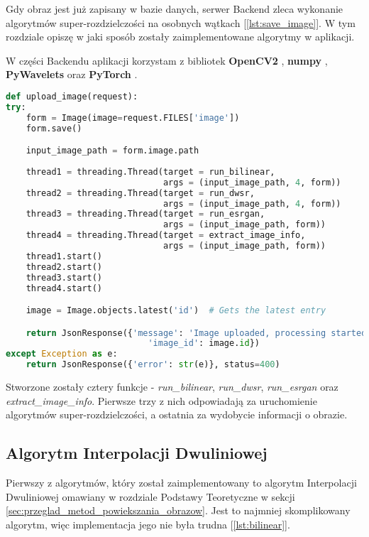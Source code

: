 Gdy obraz jest już zapisany w bazie danych, serwer Backend zleca wykonanie algorytmów super-rozdzielczości na osobnych wątkach [\ref{lst:save_image}]. W tym rozdziale opiszę w jaki sposób zostały zaimplementowane algorytmy w aplikacji.

W części Backendu aplikacji korzystam z bibliotek \textbf{OpenCV2} \cite{opencv}, \textbf{numpy} \cite{numpy}, \textbf{PyWavelets} \cite{pywavelets} oraz \textbf{PyTorch} \cite{pytorch}.

\begin{lstlisting}[language=Python, caption=Obsługa zapisu i przetwarzania obrazów., label={lst:save_image}]
def upload_image(request):
try:
    form = Image(image=request.FILES['image'])
    form.save()

    input_image_path = form.image.path
    
    thread1 = threading.Thread(target = run_bilinear, 
                               args = (input_image_path, 4, form))
    thread2 = threading.Thread(target = run_dwsr, 
                               args = (input_image_path, 4, form))
    thread3 = threading.Thread(target = run_esrgan, 
                               args = (input_image_path, form))
    thread4 = threading.Thread(target = extract_image_info, 
                               args = (input_image_path, form))
    thread1.start()
    thread2.start()
    thread3.start()
    thread4.start()

    image = Image.objects.latest('id')  # Gets the latest entry

    return JsonResponse({'message': 'Image uploaded, processing started', 
                            'image_id': image.id})
except Exception as e:
    return JsonResponse({'error': str(e)}, status=400)
\end{lstlisting}

Stworzone zostały cztery funkcje - \textit{run\_bilinear}, \textit{run\_dwsr}, \textit{run\_esrgan} oraz\\ \textit{extract\_image\_info}. Pierwsze trzy z nich odpowiadają za uruchomienie algorytmów super-rozdzielczości, a ostatnia za wydobycie informacji o obrazie.




\subsection*{Algorytm Interpolacji Dwuliniowej}

Pierwszy z algorytmów, który został zaimplementowany to algorytm Interpolacji Dwuliniowej omawiany w rozdziale Podstawy Teoretyczne w sekcji \ref{sec:przeglad_metod_powiekszania_obrazow}.
Jest to najmniej skomplikowany algorytm, więc implementacja jego nie była trudna [\ref{lst:bilinear}].

